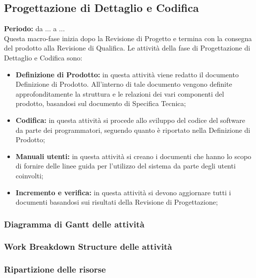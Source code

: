 \subsection{Progettazione di Dettaglio e Codifica}
	\textbf{Periodo:} da ... a ... \\
	Questa macro-fase inizia dopo la Revisione di Progetto e termina con la consegna del prodotto alla Revisione di Qualifica. Le attività della fase di Progettazione di Dettaglio e Codifica sono: \\
	\begin{itemize}
		\item \textbf{Definizione di Prodotto:} in questa attività viene redatto il documento Definizione di Prodotto. All'interno di tale documento vengono definite approfonditamente la struttura e le relazioni dei vari componenti del prodotto, basandosi sul documento di Specifica Tecnica; \\
		\item \textbf{Codifica:} in questa attività si procede allo sviluppo del codice del software da parte dei programmatori, seguendo quanto è riportato nella Definizione di Prodotto; \\
		\item \textbf{Manuali utenti:} in questa attività si creano i documenti che hanno lo scopo
di fornire delle linee guida per l'utilizzo del sistema da parte degli utenti coinvolti; \\
		\item \textbf{Incremento e verifica:} in questa attività si devono aggiornare tutti i documenti
basandosi sui risultati della Revisione di Progettazione; \\
	\end{itemize}
\subsubsection{Diagramma di Gantt delle attività}
\subsubsection{Work Breakdown Structure delle attività}
\subsubsection{Ripartizione delle risorse}
